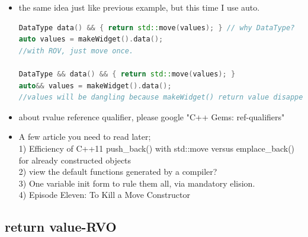 \documentclass[a4paper,11pt,twoside]{book}
\begin{document}
\begin{itemize}
\item the same idea just like previous example, but this time I use auto.
\begin{lstlisting}[frame=single, language=c++]
DataType data() && { return std::move(values); } // why DataType?
auto values = makeWidget().data();
//with ROV, just move once. 

DataType && data() && { return std::move(values); }
auto&& values = makeWidget().data();
//values will be dangling because makeWidget() return value disappear.
\end{lstlisting}

	\item about rvalue reference qualifier, please google "C++ Gems: ref-qualifiers"
	
	\item A few article you need to read later; \\
	1) Efficiency of C++11 push\_back() with std::move versus emplace\_back() for already constructed objects \\
	
	2) view the default functions generated by a compiler?\\
	
	3) One variable init form to rule them all, via mandatory elision.\\
	
	4) Episode Eleven: To Kill a Move Constructor\\
\end{itemize}

\subsection{return value-RVO}
\end{document}
